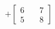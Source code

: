 \documentclass[preview]{standalone}
\begin{document}
\begin{align*}
+\begin{bmatrix} 6 & \quad 7 \\ 5 & \quad 8 \end{bmatrix}
\end{align*}
\end{document}
